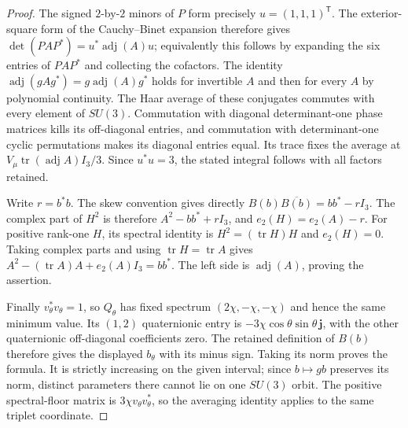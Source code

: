 \begin{proof}
The signed $2$-by-$2$ minors of $P$ form precisely $u=(1,1,1)^{\mathsf T}$.
The exterior-square form of the Cauchy--Binet expansion therefore gives
$\det(PAP^*)=u^*\operatorname{adj}(A)u$; equivalently this follows by
expanding the six entries of $PAP^*$ and collecting the cofactors.
The identity $\operatorname{adj}(gAg^*)=g\operatorname{adj}(A)g^*$
holds for invertible $A$ and then for every $A$ by polynomial continuity.
The Haar average of these conjugates commutes with every element of
$SU(3)$. Commutation with diagonal determinant-one phase matrices kills
its off-diagonal entries, and commutation with determinant-one cyclic
permutations makes its diagonal entries equal. Its trace fixes the
average at $V_\mu\operatorname{tr}(\operatorname{adj}A)I_3/3$.
Since $u^*u=3$, the stated integral follows with all factors retained.

Write $r=b^*b$. The skew convention gives directly
$B(b)\overline{B(b)}=bb^*-rI_3$.
The complex part of $H^2$ is therefore $A^2-bb^*+rI_3$,
and $e_2(H)=e_2(A)-r$.
For positive rank-one $H$, its spectral identity is
$H^2=(\operatorname{tr}H)H$ and $e_2(H)=0$.
Taking complex parts and using $\operatorname{tr}H=\operatorname{tr}A$
gives
$A^2-(\operatorname{tr}A)A+e_2(A)I_3=bb^*$.
The left side is $\operatorname{adj}(A)$, proving the assertion.

Finally $v_\theta^*v_\theta=1$, so $Q_\theta$ has fixed spectrum
$(2\chi,-\chi,-\chi)$ and hence the same minimum value.
Its $(1,2)$ quaternionic entry is
$-3\chi\cos\theta\sin\theta\,\mathbf j$, with the other quaternionic
off-diagonal coefficients zero. The retained definition of $B(b)$
therefore gives the displayed $b_\theta$ with its minus sign.
Taking its norm proves the formula. It is strictly increasing on the
given interval; since $b\mapsto gb$ preserves its norm, distinct
parameters there cannot lie on one $SU(3)$ orbit.
The positive spectral-floor matrix is $3\chi v_\theta v_\theta^*$,
so the averaging identity applies to the same triplet coordinate.
\end{proof}
